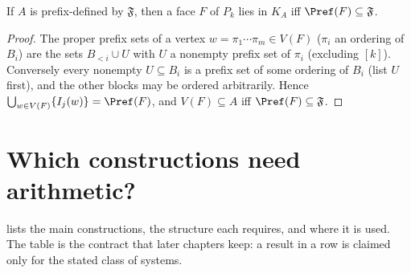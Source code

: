 \begin{lemma}\label{lem:faces-prefix}
If $A$ is prefix-defined by $\mathfrak F$, then a face $F$ of $P_k$ lies in $K_A$ iff $\Pref(F)\subseteq\mathfrak F$.
\end{lemma}
\begin{proof}
The proper prefix sets of a vertex $w=\pi_1\cdots\pi_m\in V(F)$ ($\pi_i$ an ordering of $B_i$) are the sets $B_{<i}\cup U$ with $U$ a nonempty prefix set of $\pi_i$ (excluding $[k]$). Conversely every nonempty $U\subseteq B_i$ is a prefix set of some ordering of $B_i$ (list $U$ first), and the other blocks may be ordered arbitrarily. Hence $\bigcup_{w\in V(F)}\{I_j(w)\}=\Pref(F)$, and $V(F)\subseteq A$ iff $\Pref(F)\subseteq\mathfrak F$.
\end{proof}

\section{Which constructions need arithmetic?}\label{sec:needs}
 lists the main constructions, the structure each requires, and where it is used. The table is the contract that later chapters keep: a result in a row is claimed only for the stated class of systems.

